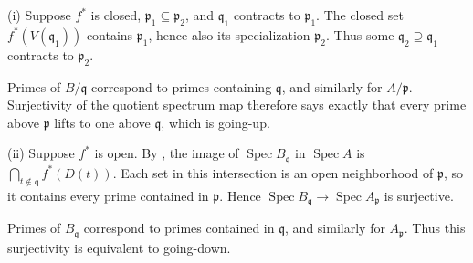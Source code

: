 (i) Suppose $f^*$ is closed, $\mathfrak{p}_1\subseteq\mathfrak{p}_2$, and $\mathfrak{q}_1$ contracts to $\mathfrak{p}_1$. The closed set $f^*(V(\mathfrak{q}_1))$ contains $\mathfrak{p}_1$, hence also its specialization $\mathfrak{p}_2$. Thus some $\mathfrak{q}_2\supseteq\mathfrak{q}_1$ contracts to $\mathfrak{p}_2$.

Primes of $B/\mathfrak{q}$ correspond to primes containing $\mathfrak{q}$, and similarly for $A/\mathfrak{p}$. Surjectivity of the quotient spectrum map therefore says exactly that every prime above $\mathfrak{p}$ lifts to one above $\mathfrak{q}$, which is going-up.

(ii) Suppose $f^*$ is open. By , the image of $\operatorname{Spec}B_{\mathfrak{q}}$ in $\operatorname{Spec}A$ is $\bigcap_{t\notin\mathfrak{q}}f^*(D(t))$. Each set in this intersection is an open neighborhood of $\mathfrak{p}$, so it contains every prime contained in $\mathfrak{p}$. Hence $\operatorname{Spec}B_{\mathfrak{q}}\to\operatorname{Spec}A_{\mathfrak{p}}$ is surjective.

Primes of $B_{\mathfrak{q}}$ correspond to primes contained in $\mathfrak{q}$, and similarly for $A_{\mathfrak{p}}$. Thus this surjectivity is equivalent to going-down.
